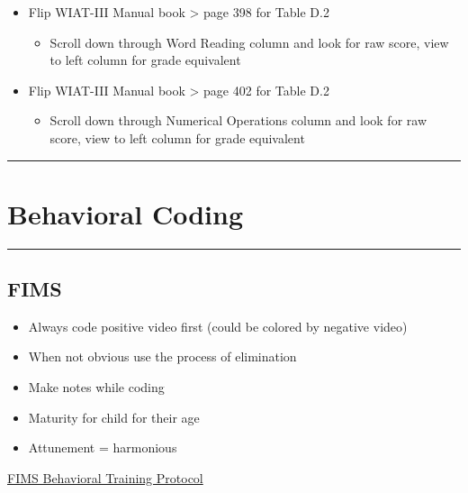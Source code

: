 \documentclass[]{book}
\providecommand{\tightlist}{%
  \setlength{\itemsep}{0pt}\setlength{\parskip}{0pt}}
\begin{document}
\begin{itemize}
\tightlist
\item
  Flip WIAT-III Manual book \textgreater{} page 398 for Table D.2

  \begin{itemize}
  \tightlist
  \item
    Scroll down through Word Reading column and look for raw score, view
    to left column for grade equivalent
  \end{itemize}
\item
  Flip WIAT-III Manual book \textgreater{} page 402 for Table D.2

  \begin{itemize}
  \tightlist
  \item
    Scroll down through Numerical Operations column and look for raw
    score, view to left column for grade equivalent
  \end{itemize}
\end{itemize}

\begin{center}\rule{0.5\linewidth}{0.5pt}\end{center}

\section{Behavioral Coding}\label{behavioral-coding}

\begin{center}\rule{0.5\linewidth}{0.5pt}\end{center}

\subsection{FIMS}\label{fims}

\begin{itemize}
\tightlist
\item
  Always code positive video first (could be colored by negative video)
\item
  When not obvious use the process of elimination
\item
  Make notes while coding
\item
  Maturity for child for their age
\item
  Attunement = harmonious
\end{itemize}

\href{https://docs.google.com/document/d/1oLEg1gAdpcrDWg1Vlh0z_esq9fBy9CKBrNuU-ZokaKg/edit?usp=sharing}{FIMS
Behavioral Training Protocol}
\end{document}
